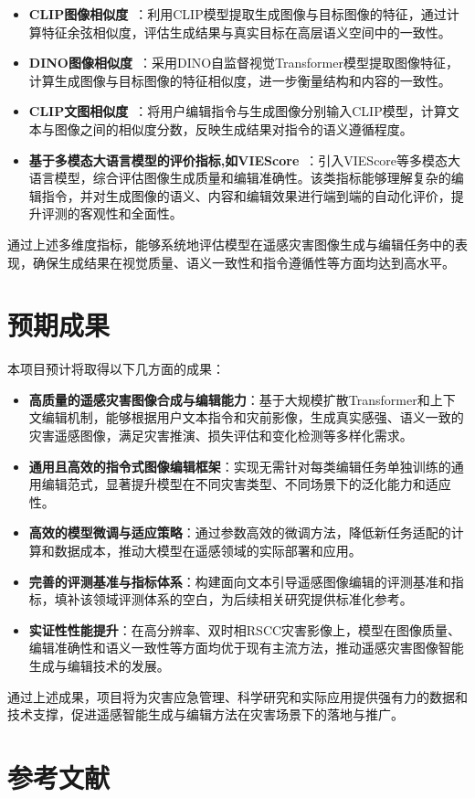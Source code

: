 \documentclass[12pt,a4paper]{article}
\begin{document}
\begin{itemize}
    \item \textbf{CLIP图像相似度}~\parencite{radfordLearningTransferableVisual2021,hesselCLIPScoreReferencefreeEvaluation2021}：利用CLIP模型提取生成图像与目标图像的特征，通过计算特征余弦相似度，评估生成结果与真实目标在高层语义空间中的一致性。
    \item \textbf{DINO图像相似度}~\parencite{oquabDINOv2LearningRobust2024}：采用DINO自监督视觉Transformer模型提取图像特征，计算生成图像与目标图像的特征相似度，进一步衡量结构和内容的一致性。
    \item \textbf{CLIP文图相似度}~\parencite{radfordLearningTransferableVisual2021}：将用户编辑指令与生成图像分别输入CLIP模型，计算文本与图像之间的相似度分数，反映生成结果对指令的语义遵循程度。
    \item \textbf{基于多模态大语言模型的评价指标,如VIEScore}~\parencite{kuVIEScoreExplainableMetrics2024}：引入VIEScore等多模态大语言模型，综合评估图像生成质量和编辑准确性。该类指标能够理解复杂的编辑指令，并对生成图像的语义、内容和编辑效果进行端到端的自动化评价，提升评测的客观性和全面性。
\end{itemize}

通过上述多维度指标，能够系统地评估模型在遥感灾害图像生成与编辑任务中的表现，确保生成结果在视觉质量、语义一致性和指令遵循性等方面均达到高水平。


\section{预期成果}

本项目预计将取得以下几方面的成果：

\begin{itemize}
    \item \textbf{高质量的遥感灾害图像合成与编辑能力}：基于大规模扩散Transformer和上下文编辑机制，能够根据用户文本指令和灾前影像，生成真实感强、语义一致的灾害遥感图像，满足灾害推演、损失评估和变化检测等多样化需求。
    \item \textbf{通用且高效的指令式图像编辑框架}：实现无需针对每类编辑任务单独训练的通用编辑范式，显著提升模型在不同灾害类型、不同场景下的泛化能力和适应性。
    \item \textbf{高效的模型微调与适应策略}：通过参数高效的微调方法，降低新任务适配的计算和数据成本，推动大模型在遥感领域的实际部署和应用。
    \item \textbf{完善的评测基准与指标体系}：构建面向文本引导遥感图像编辑的评测基准和指标，填补该领域评测体系的空白，为后续相关研究提供标准化参考。
    \item \textbf{实证性性能提升}：在高分辨率、双时相RSCC灾害影像上，模型在图像质量、编辑准确性和语义一致性等方面均优于现有主流方法，推动遥感灾害图像智能生成与编辑技术的发展。
\end{itemize}

通过上述成果，项目将为灾害应急管理、科学研究和实际应用提供强有力的数据和技术支撑，促进遥感智能生成与编辑方法在灾害场景下的落地与推广。



\section{参考文献}
\printbibliography
\end{document}
